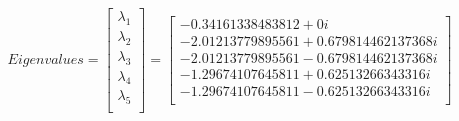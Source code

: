 \documentclass[a4paper, 12pt]{article}
\begin{document}
\begin{align}
	Eigenvalues = 
	\begin{bmatrix}
		\lambda_1\\\lambda_2\\\lambda_3\\\lambda_4\\\lambda_5\\
	\end{bmatrix}=
	\begin{bmatrix}
		-0.34161338483812 + 0i \\-2.01213779895561+0.679814462137368i \\
		-2.01213779895561-0.679814462137368i \\ -1.29674107645811 + 0.62513266343316i \\
		-1.29674107645811 - 0.62513266343316i \\
	\end{bmatrix}
\end{align}
\end{document}
